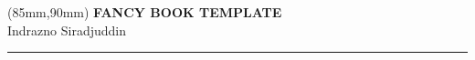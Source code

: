 \documentclass[12pt]{extreport}
\begin{document}



	\thispagestyle{empty}
	\begin{textblock*}{60mm}(85mm,90mm)
	\noindent
	{\sffamily\LARGE\bfseries FANCY BOOK TEMPLATE}\\
	\noindent
	{\sffamily\small Indrazno Siradjuddin}\\
	{\color{dark-gray}\rule[5pt]{170pt}{3pt}}
	\end{textblock*}
	\null\newpage



	\thispagestyle{empty}
	\null\newpage

	\renewcommand\contentsname{Table of Contents} %
	\tableofcontents

	

	\thispagestyle{empty}
	\null\newpage

	\setcounter{page}{1}
	


	
	\ifodd\value{page}
	\thispagestyle{empty}
	\null\newpage
	\fi
\end{document}
